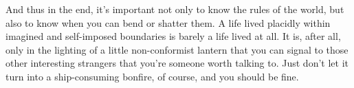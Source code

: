 And thus in the end, it's important not only to know the rules of the world, but also to know when you can bend or shatter them. A life lived placidly within imagined and self-imposed boundaries is barely a life lived at all. It is, after all, only in the lighting of a little non-conformist lantern that you can signal to those other interesting strangers that you're someone worth talking to. Just don't let it turn into a ship-consuming bonfire, of course, and you should be fine.
